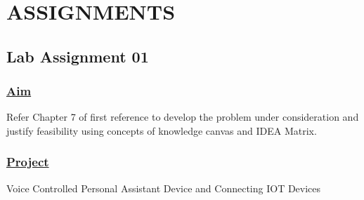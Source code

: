 \chapter{ASSIGNMENTS}
\section*{\centering\LARGE{Lab Assignment 01}}

\subsection*{\underline{Aim}}
Refer Chapter 7 of first reference to develop the problem under consideration and justify feasibility using concepts of knowledge canvas and IDEA Matrix. 
\subsection*{\underline{Project}}
Voice Controlled Personal Assistant Device and Connecting IOT Devices \\


